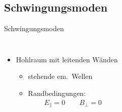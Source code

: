 \documentclass[12pt,xcolor=dvipsnames,professionalfonts]{beamer}
\begin{document}
\subsection{Schwingungsmoden}
\begin{frame}{Schwingungsmoden}
	\begin{columns}[T]
		\begin{itemize}
			\item Hohlraum mit leitenden Wänden
			\begin{itemize}
				\setlength\itemsep{0.25em}
				
				\item stehende em.\ Wellen
				
				\item Randbedingungen:
				\begin{align*}
				E_\parallel = 0 \qquad B_\perp = 0
				\end{align*}
				

\end{itemize}
\end{itemize}
\end{columns}
\end{frame}
\end{document}

